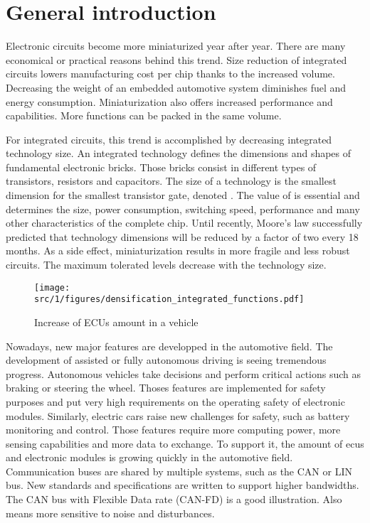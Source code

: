 \section{General introduction}

Electronic circuits become more miniaturized year after year.
There are many economical or practical reasons behind this trend.
Size reduction of integrated circuits lowers manufacturing cost per chip thanks to the increased volume.
Decreasing the weight of an embedded automotive system diminishes fuel and energy consumption.
Miniaturization also offers increased performance and capabilities.
More functions can be packed in the same volume.

For integrated circuits, this trend is accomplished by decreasing integrated technology size.
An integrated technology defines the dimensions and shapes of fundamental electronic bricks.
Those bricks consist in different types of transistors, resistors and capacitors.
The size of a technology is the smallest dimension for the smallest transistor gate, denoted \textlambda.
The value of \textlamda is essential and determines the size, power consumption, switching speed, performance and many other characteristics of the complete chip.
Until recently, Moore's law successfully predicted that technology dimensions will be reduced by a factor of two every 18 months.
As a side effect, miniaturization results in more fragile and less robust circuits.
The maximum tolerated levels decrease with the technology size.

\begin{figure}[!h]
  \centering
  \texttt{[image: src/1/figures/densification\_integrated\_functions.pdf]}
  \caption{Increase of ECUs amount in a vehicle}
  \label{fig:ecus-increase}
\end{figure}

Nowadays, new major features are developped in the automotive field.
The development of assisted or fully autonomous driving is seeing tremendous progress.
Autonomous vehicles take decisions and perform critical actions such as braking or steering the wheel.
Thoses features are implemented for safety purposes and put very high requirements on the operating safety of electronic modules.
Similarly, electric cars raise new challenges for safety, such as battery monitoring and control.
Those features require more computing power, more sensing capabilities and more data to exchange.
To support it, the amount of \gls{ecu}s and electronic modules is growing quickly in the automotive field.
Communication buses are shared by multiple systems, such as the CAN or LIN bus.
New standards and specifications are written to support higher bandwidths.
The CAN bus with Flexible Data rate (CAN-FD) is a good illustration.
Also means more sensitive to noise and disturbances.

